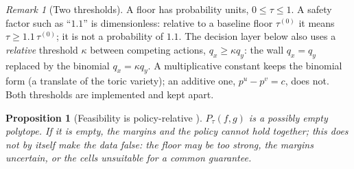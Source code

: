 \documentclass[11pt]{article}
\newtheorem{proposition}[theorem]{Proposition}
\theoremstyle{definition}
\theoremstyle{remark}
\newtheorem{remark}[theorem]{Remark}
\begin{document}
\begin{remark}[Two thresholds]\label{rem:thresholds}
A floor has probability units, $0\le\tau\le1$. A safety factor such as ``$1.1$'' is dimensionless: relative to a baseline floor
$\tau^{(0)}$ it means $\tau\ge1.1\,\tau^{(0)}$; it is not a probability of $1.1$. The decision layer below also uses a \emph{relative}
threshold $\kappa$ between competing actions, $q_x\ge\kappa q_y$: the wall $q_x=q_y$ replaced by the binomial $q_x=\kappa q_y$. A
multiplicative constant keeps the binomial form (a translate of the toric variety); an additive one, $p^u-p^v=c$, does not. Both
thresholds are implemented and kept apart.
\end{remark}

\begin{proposition}[Feasibility is policy-relative \cite{SupportAmbience}]
$P_\tau(f,g)$ is a possibly empty polytope. If it is empty, the margins and the policy cannot hold together; this does not by itself
make the data false: the floor may be too strong, the margins uncertain, or the cells unsuitable for a common guarantee.
\end{proposition}
\end{document}
